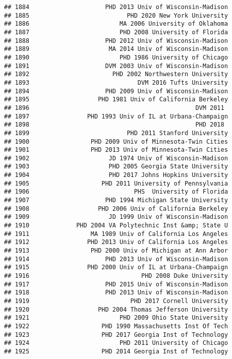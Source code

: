 \documentclass[
]{article}
\begin{document}
\begin{verbatim}
## 1884                     PHD 2013 Univ of Wisconsin-Madison
## 1885                           PHD 2020 New York University
## 1886                         MA 2006 University of Oklahoma
## 1887                         PHD 2008 University of Florida
## 1888                     PHD 2012 Univ of Wisconsin-Madison
## 1889                      MA 2014 Univ of Wisconsin-Madison
## 1890                         PHD 1986 University of Chicago
## 1891                     DVM 2003 Univ of Wisconsin-Madison
## 1892                       PHD 2002 Northwestern University
## 1893                              DVM 2016 Tufts University
## 1894                     PHD 2009 Univ of Wisconsin-Madison
## 1895                   PHD 1981 Univ of California Berkeley
## 1896                                              DVM 2011 
## 1897                PHD 1993 Univ of IL at Urbana-Champaign
## 1898                                              PHD 2018 
## 1899                           PHD 2011 Stanford University
## 1900                 PHD 2009 Univ of Minnesota-Twin Cities
## 1901                 PHD 2013 Univ of Minnesota-Twin Cities
## 1902                      JD 1974 Univ of Wisconsin-Madison
## 1903                      PHD 2005 Georgia State University
## 1904                      PHD 2017 Johns Hopkins University
## 1905                    PHD 2011 University of Pennsylvania
## 1906                             PHS  University of Florida
## 1907                     PHD 1994 Michigan State University
## 1908                   PHD 2006 Univ of California Berkeley
## 1909                      JD 1999 Univ of Wisconsin-Madison
## 1910             PHD 2004 VA Polytechnic Inst &amp; State U
## 1911                 MA 1989 Univ of California Los Angeles
## 1912                PHD 2013 Univ of California Los Angeles
## 1913                 PHD 2000 Univ of Michigan at Ann Arbor
## 1914                     PHD 2013 Univ of Wisconsin-Madison
## 1915                PHD 2000 Univ of IL at Urbana-Champaign
## 1916                               PHD 2008 Duke University
## 1917                     PHD 2015 Univ of Wisconsin-Madison
## 1918                     PHD 2013 Univ of Wisconsin-Madison
## 1919                            PHD 2017 Cornell University
## 1920                   PHD 2004 Thomas Jefferson University
## 1921                         PHD 2009 Ohio State University
## 1922                    PHD 1990 Massachusetts Inst Of Tech
## 1923                    PHD 2017 Georgia Inst of Technology
## 1924                         PHD 2011 University of Chicago
## 1925                    PHD 2014 Georgia Inst of Technology

\end{verbatim}
\end{document}
